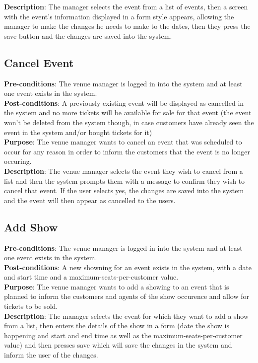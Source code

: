 \textbf{Description}:
The manager selects the event from a list of events, then a screen with
the event's information displayed in a form style appears, allowing the
manager to  make the changes he needs to make to the dates, then they
press the save button and the changes are saved into the system.

\subsection{Cancel Event}
\textbf{Pre-conditions}: The venue manager is logged in into the system and
at least one event exists in the system.\\

\textbf{Post-conditions}: A previously existing event will be displayed
as cancelled in the system and no more tickets will be available for sale
for that event (the event won't be deleted from the system though, in case
customers have already seen the event in the system and/or bought tickets
for it)\\

\textbf{Purpose}: The venue manager wants to cancel an event that was
scheduled to occur for any reason in order to inform the customers
that the event is no longer occuring.\\

\textbf{Description}: The venue manager selects the event they wish to
cancel from a list and then the system prompts them with a message
to confirm they wish to cancel that event. If the user selects yes, the
changes are saved into the system and the event will then appear as
cancelled to the users.

\subsection{Add Show}
\textbf{Pre-conditions}: The venue manager is logged in into the system
and at least one event exists in the system.\\

\textbf{Post-conditions}: A new showning for an event exists in the system,
with a date and start time and a maximum-seats-per-customer value.\\

\textbf{Purpose}: The venue manager wants to add a showing to an event
that is planned to inform the customers and agents of the show occurence
and allow for tickets to be sold.\\

\textbf{Description}: The manager selects the event for which they
want to add a show from a list, then enters the details of the show
in a form (date the show is happening and start and end time as well
as the maximum-seats-per-customer value) and then presses save which
will save the changes in the system and inform the user of the changes.


